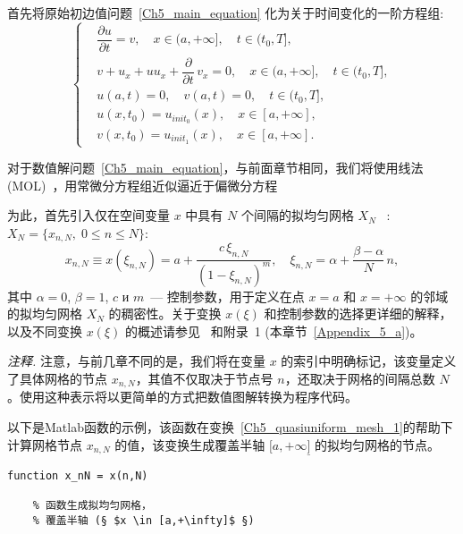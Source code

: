 \documentclass[twoside]{book}
\begin{document}
\begin{CJK*}{GBK}{song}
首先将原始初边值问题~\eqref{Ch5_main_equation} 化为关于时间变化的一阶方程组:
\begin{equation}
\label{Ch5_reduced_equation_V1}
    \left\{
    \begin{aligned}
        &\dfrac{\partial u}{\partial t} = v, \quad x \in (a,+\infty], \quad t \in (t_0,T], \\
        &v + u_{x} + u u_{x} + \dfrac{\partial}{\partial t} \, v_{x} = 0, \quad x \in (a,+\infty], \quad t \in (t_0,T], \\
        &u(a,t) = 0, \quad v(a,t) = 0, \quad t \in (t_0,T],\\
        &u(x,t_0) = u_{init_0}(x), \quad x \in [a,+\infty],\\
        &v(x,t_0) = u_{init_1}(x), \quad x \in [a,+\infty].
    \end{aligned}
    \right.
\end{equation}

对于数值解问题~\eqref{Ch5_main_equation}，与前面章节相同，我们将使用线法(MOL)~\cite{Kalitkin&Ko_1,Kalitkin,Hairer&Wanner}，用常微分方程组近似逼近于偏微分方程

为此，首先引入仅在空间变量 $x$ 中具有 $N$ 个间隔的拟均匀网格 $X_N$~\cite{Kalitkin_book_3} : $X_N = \{x_{n,N}, \; 0 \leqslant n \leqslant N\}$:
\begin{equation}
    \label{Ch5_quasiuniform_mesh_1}
    x_{n,N} \equiv x(\xi_{n,N}) = a + \dfrac{c \, \xi_{n,N}}{(1 - \xi_{n,N})^m}, \quad \xi_{n,N} = \alpha + \dfrac{\beta - \alpha}{N} \, n,
\end{equation}
其中 $\alpha = 0$, $\beta = 1$, $c$ и $m$~--- 控制参数，用于定义在点 $x = a$ 和 $x = +\infty$ 的邻域的拟均匀网格 $X_N$ 的稠密性。关于变换 $x(\xi)$ 和控制参数的选择更详细的解释，以及不同变换 $x(\xi)$ 的概述请参见~\cite{Kalitkin_book_3} 和附录~1 (本章节~\ref{Appendix_5_a})。

\emph{注释.} 注意，与前几章不同的是，我们将在变量 $x$ 的索引中明确标记，该变量定义了具体网格的节点 $x_{n,N}$，其值不仅取决于节点号 $n$，还取决于网格的间隔总数 $N$。使用这种表示将以更简单的方式把数值图解转换为程序代码。

以下是Matlab函数的示例，该函数在变换~\eqref{Ch5_quasiuniform_mesh_1}的帮助下计算网格节点 $x_{n,N}$ 的值，该变换生成覆盖半轴 $[a,+\infty\underline{]}$ 的拟均匀网格的节点。

%
\begin{lstlisting}
function x_nN = x(n,N)

    % 函数生成拟均匀网格，
    % 覆盖半轴 (§ $x \in [a,+\infty]$ §)


\end{lstlisting}
\end{CJK*}
\end{document}
